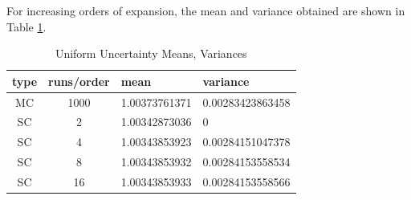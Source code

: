 \documentclass[11pt]{article} %
\begin{document}
For increasing orders of expansion, the mean and variance obtained are shown in Table \ref{runstats}.  

\begin{table}
\begin{center}
\begin{tabular}{c c|l l}
type & runs/order & mean & variance \\ \hline
MC & 1000 & 1.00373761371 & 0.00283423863458\\
SC & 2 & 1.00342873036 & 0 \\
SC & 4 & 1.00343853923 & 0.00284151047378 \\
SC & 8 & 1.00343853932 & 0.00284153558534 \\
SC & 16 & 1.00343853933 & 0.00284153558566 
\end{tabular}
\end{center}
\caption{Uniform Uncertainty Means, Variances}
\label{runstats}
\end{table}
\end{document}
